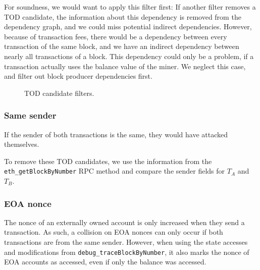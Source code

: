 \documentclass[draft,final]{vutinfth} %
\begin{document}
For soundness, we would want to apply this filter first: If another filter removes a TOD candidate, the information about this dependency is removed from the dependency graph, and we could miss potential indirect dependencies. However, because of transaction fees, there would be a dependency between every transaction of the same block, and we have an indirect dependency between nearly all transactions of a block. This dependency could only be a problem, if a transaction actually uses the balance value of the miner. We neglect this case, and filter out block producer dependencies first.

\begin{figure}[h]
    \centering
    \caption{TOD candidate filters.}
    \label{fig:tod_candidate_dependency}
\end{figure}

\subsubsection{Same sender}

If the sender of both transactions is the same, they would have attacked themselves.

To remove these TOD candidates, we use the information from the \verb|eth_getBlockByNumber| RPC method and compare the sender fields for $T_A$ and $T_B$.

\subsubsection{EOA nonce}


The nonce of an externally owned account is only increased when they send a transaction. As such, a collision on EOA nonces can only occur if both transactions are from the same sender. However, when using the state accesses and modifications from \verb|debug_traceBlockByNumber|, it also marks the nonce of EOA accounts as accessed, even if only the balance was accessed.
\end{document}
